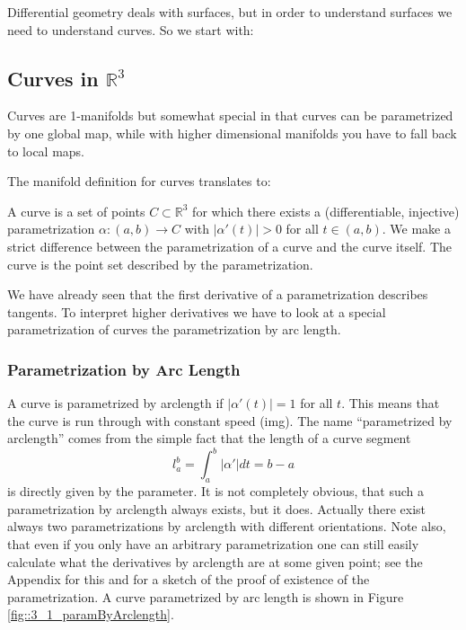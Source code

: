 Differential geometry deals with surfaces, but in order to understand surfaces we need to understand curves. So we start with:

\subsection{Curves in $\mathbb R^3$}
Curves are 1-manifolds but somewhat special in that curves can be parametrized by one global map, while with higher dimensional manifolds you have to fall back to local maps. 

The manifold definition for curves translates to: 

\begin{definition}[Curve] A curve is a set of points $C \subset \mathbb R^3$ for which there exists a (differentiable, injective) parametrization $\alpha : (a,b) \to C$ with $\left|\alpha'(t)\right| >0$ for all $t\in (a,b)$. We make a strict difference between the parametrization of a curve and the curve itself. The curve is the point set described by the parametrization.
\end{definition}


We have already seen that the first derivative of a parametrization describes tangents. To interpret higher derivatives we have to look at a special parametrization of curves the parametrization by arc length.

\subsubsection{Parametrization by Arc Length}

A curve is parametrized by arclength if $|\alpha'(t)|=1$ for all $t$. This means that the curve is run through with constant speed (img). The name ``parametrized by arclength'' comes from the simple fact that the length of a curve segment 
\[l_a^b = \int_a^b |\alpha'| dt = b-a\]
is directly given by the parameter. It is not completely obvious, that such a parametrization by arclength always exists, but it does. Actually there exist always two parametrizations by arclength with different orientations. Note also, that even if you only have an arbitrary parametrization one can still easily calculate what the derivatives by arclength are at some given point; see the Appendix for this and for a sketch of the proof of existence of the parametrization. A curve parametrized by arc length is shown in Figure \ref{fig::3_1_paramByArclength}.

